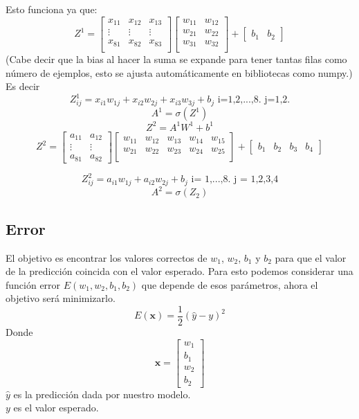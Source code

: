 \documentclass{article}
\begin{document}
	Esto funciona ya que:
	\[
	Z^1 = \begin{bmatrix}
		x_{11} & x_{12} & x_{13} \\
		\vdots & \vdots & \vdots \\
		x_{81} & x_{82} & x_{83} \\
	\end{bmatrix}
	\begin{bmatrix}
		w_{11} & w_{12}\\
		w_{21} & w_{22}\\
		w_{31} & w_{32} \\
	\end{bmatrix}
	+
	\begin{bmatrix}
		b_1 & b_2
	\end{bmatrix}
	\]
	(Cabe decir que la bias al hacer la suma se expande para tener tantas filas como número de ejemplos, esto se ajusta automáticamente en bibliotecas como numpy.)
	Es decir 
	\[
	Z^1_{ij} = x_{i1} w_{1j} + x_{i2} w_{2j} + x_{i3} w_{3j} + b_j
	\text{     i=1,2,...,8. j=1,2.}
	\]
	\[
	A^1 = \sigma(Z^1)
	\]
	\[
	Z^2 = A^1 W^1 + b^1
	\]
	\[
	Z^2 = \begin{bmatrix}
		a_{11} & a_{12}\\
		\vdots & \vdots \\
		a_{81} & a_{82}
	\end{bmatrix}
	\begin{bmatrix}
		w_{11} & w_{12} & w_{13} & w_{14} & w_{15}\\
		w_{21} & w_{22} & w_{23} & w_{24} & w_{25}\\
	\end{bmatrix}
	+ 
	\begin{bmatrix}
		b_1 & b_2 & b_3 & b_4
	\end{bmatrix}	
	\]
	
	\[
	Z^2_{ij} = a_{i1}w_{1j} + a_{i2}w_{2j} + b_j \text{ i= 1,...,8. j = 1,2,3,4} 
	\]
	\[
	A^2 = \sigma(Z_2)
	\]
	
	\subsection{Error}
	El objetivo es encontrar los valores correctos de $w_1$, $w_2$, $b_1$ y $b_2$ para que el valor de la predicción coincida con el valor esperado. Para esto podemos considerar una función error $E(w_1, w_2, b_1, b_2)$ que depende de esos parámetros, ahora el objetivo será minimizarlo.
	\[
	E(\textbf{x}) = \frac{1}{2}(\hat{y} - y )^2
	\]
	Donde 
	\[
	\textbf{x} = \begin{bmatrix} 
		w_1\\
		b_1\\
		w_2\\
		b_2
	\end{bmatrix}
	\]
	$\hat{y}$ es la predicción dada por nuestro modelo.\\
	$y$ es el valor esperado.\\
	
\end{document}
